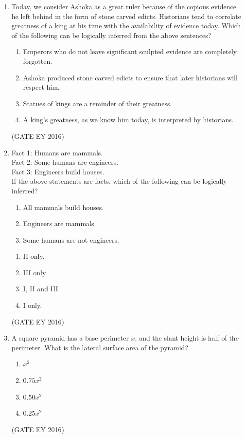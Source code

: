 \documentclass[journal]{IEEEtran}
\begin{document}
\begin{enumerate}[label=Q.\arabic*.]
\item Today, we consider Ashoka as a great ruler because of the copious evidence he left behind in the form of stone carved edicts. Historians tend to correlate greatness of a king at his time with the availability of evidence today. Which of the following can be logically inferred from the above sentences?
\begin{enumerate}
    \item Emperors who do not leave significant sculpted evidence are completely forgotten.
    \item Ashoka produced stone carved edicts to ensure that later historians will respect him.
    \item Statues of kings are a reminder of their greatness.
    \item A king's greatness, as we know him today, is interpreted by historians.
    \end{enumerate}
\hfill{(GATE EY 2016)}

\item Fact 1: Humans are mammals. \\
Fact 2: Some humans are engineers. \\
Fact 3: Engineers build houses.
\\
If the above statements are facts, which of the following can be logically inferred? 
  \begin{enumerate}[label=\Roman*.]
    \item All mammals build houses. 
    \item  Engineers are mammals. 
    \item Some humans are not engineers.
  \end{enumerate}
\begin{multicols}{2}
\begin{enumerate}
    \item II only.
    \item III only.
    \item I, II and III.
    \item I only.
    \end{enumerate}
\end{multicols}
\hfill{(GATE EY 2016)}

\item A square pyramid has a base perimeter $x$, and the slant height is half of the perimeter. What is the lateral surface area of the pyramid?
\begin{multicols}{4}
\begin{enumerate}
    \item $x^{2}$
    \item $0.75 x^{2}$
    \item $0.50 x^{2}$
    \item $0.25 x^{2}$
\end{enumerate}
\end{multicols}
\hfill{(GATE EY 2016)}


\end{enumerate}
\end{document}
